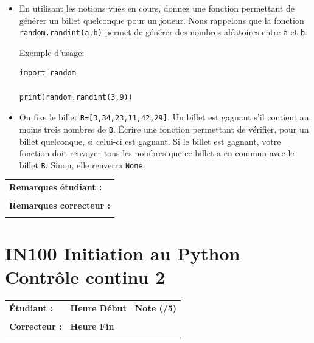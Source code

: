 \documentclass[a4paper,11pt]{article}
\begin{document}
\begin{itemize}
\item[1.]  En utilisant les notions vues en cours, donnez une fonction permettant de générer un billet quelconque pour un joueur. 
Nous rappelons que la fonction \texttt{random.randint(a,b)} permet de générer des nombres aléatoires entre \texttt{a} et \texttt{b}. 

Exemple d'usage: 
\begin{verbatim}
import random

print(random.randint(3,9))

\end{verbatim}

\item[2.] On fixe le billet  \texttt{B=[3,34,23,11,42,29]}.  Un billet est gagnant s'il contient au moins trois nombres de \texttt{B}. 
\'Ecrire une fonction permettant de vérifier, pour un billet quelconque, si celui-ci est gagnant. Si le billet est gagnant, votre fonction doit renvoyer tous les nombres 
que ce billet a en commun avec le billet \texttt{B}. Sinon, elle renverra \texttt{None}. 
\end{itemize}



\begin{table}[h!]
\centering
\renewcommand{\arraystretch}{1.4} %
\begin{tabular}{|p{15cm}|}
\hline
\textbf{Remarques étudiant :}    \\
 \\
\hline
\textbf{Remarques correcteur :}  \\
 \\
 \hline
\end{tabular}
\end{table}

\newpage


\section*{\center IN100 Initiation au Python\\
Contrôle continu 2}


\begin{table}[h!]
\centering
\renewcommand{\arraystretch}{1.4} %
\begin{tabular}{|p{10cm}|p{3cm}|p{2cm}|}
\hline
\textbf{Étudiant :} & \textbf{Heure Début }  & \textbf{Note (/5) }  \\
& & \\
\hline
\textbf{Correcteur :} & \textbf{Heure Fin } & \\
& & \\
\hline

\hline
\end{tabular}
\end{table}
\end{document}
